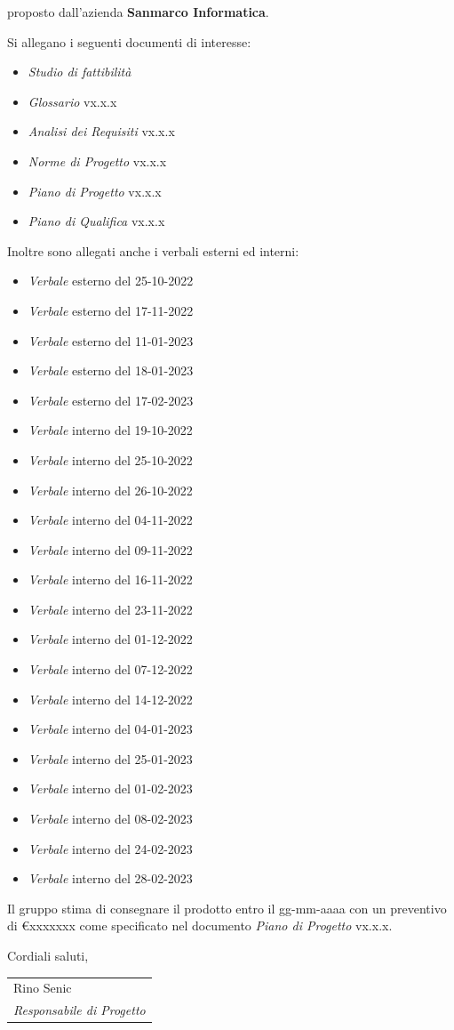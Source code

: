 \documentclass[10pt]{article}
\begin{document}
proposto dall’azienda \textbf{Sanmarco Informatica}.


Si allegano i seguenti documenti di interesse:
\begin{itemize}
  \item \textit{Studio di fattibilità}
  \item \textit{Glossario} vx.x.x
  \item \textit{Analisi dei Requisiti} vx.x.x
  \item \textit{Norme di Progetto} vx.x.x
  \item \textit{Piano di Progetto} vx.x.x
  \item \textit{Piano di Qualifica} vx.x.x
\end{itemize}

Inoltre sono allegati anche i verbali esterni ed interni:

\begin{itemize}
  \item \textit{Verbale} esterno del 25-10-2022
  \item \textit{Verbale} esterno del 17-11-2022
  \item \textit{Verbale} esterno del 11-01-2023
  \item \textit{Verbale} esterno del 18-01-2023
  \item \textit{Verbale} esterno del 17-02-2023
  \item \textit{Verbale} interno del 19-10-2022
  \item \textit{Verbale} interno del 25-10-2022
  \item \textit{Verbale} interno del 26-10-2022
  \item \textit{Verbale} interno del 04-11-2022
  \item \textit{Verbale} interno del 09-11-2022
  \item \textit{Verbale} interno del 16-11-2022
  \item \textit{Verbale} interno del 23-11-2022
  \item \textit{Verbale} interno del 01-12-2022
  \item \textit{Verbale} interno del 07-12-2022
  \item \textit{Verbale} interno del 14-12-2022
  \item \textit{Verbale} interno del 04-01-2023
  \item \textit{Verbale} interno del 25-01-2023
  \item \textit{Verbale} interno del 01-02-2023
  \item \textit{Verbale} interno del 08-02-2023
  \item \textit{Verbale} interno del 24-02-2023
  \item \textit{Verbale} interno del 28-02-2023
\end{itemize}

Il gruppo stima di consegnare il prodotto entro il gg-mm-aaaa con un preventivo di \euro{}xxxxxxx  come
specificato nel documento \textit{Piano di Progetto} vx.x.x.


Cordiali saluti,

\vspace{15pt}

\hfill
\begin{tabular}{ l @{} }
Rino Senic\\
\textit{Responsabile di Progetto}
\end{tabular}
\end{document}
